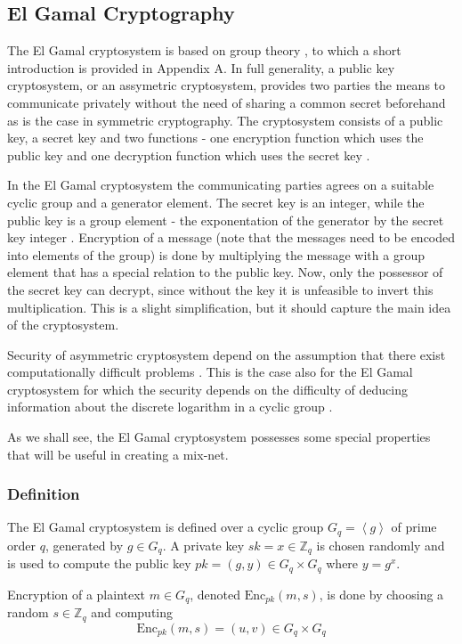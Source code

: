 \subsection{El Gamal Cryptography}

The El Gamal cryptosystem is based on group theory \cite[p.~297]{hac},
to which a short introduction is provided in Appendix A. In full
generality, a public key cryptosystem, or an assymetric cryptosystem,
provides two parties the means to communicate privately without the
need of sharing a common secret beforehand as is the case in symmetric
cryptography. The cryptosystem consists of a public key, a secret key
and two functions - one encryption function which uses the public key
and one decryption function which uses the secret key
\cite[p.~283]{hac}.

In the El Gamal cryptosystem the communicating parties agrees on a
suitable cyclic group and a generator element. The secret key is an
integer, while the public key is a group element - the exponentation
of the generator by the secret key integer
\cite[p.~297]{hac}. Encryption of a message (note that the messages
need to be encoded into elements of the group) is done by multiplying
the message with a group element that has a special relation to the
public key. Now, only the possessor of the secret key can decrypt,
since without the key it is unfeasible to invert this
multiplication. This is a slight simplification, but it should capture
the main idea of the cryptosystem.

Security of asymmetric cryptosystem depend on the assumption that
there exist computationally difficult problems
\cite[p.~306]{hac}. This is the case also for the El Gamal
cryptosystem for which the security depends on the difficulty of
deducing information about the discrete logarithm in a cyclic group
\cite[p.~294]{hac}.

As we shall see, the El Gamal cryptosystem possesses some special
properties that will be useful in creating a mix-net.

\subsubsection{Definition}
The El Gamal cryptosystem is defined over a cyclic group $G_q =
\left<g\right>$ of prime order $q$, generated by $g \in G_q$. A
private key $sk = x \in \mathbb{Z}_q$ is chosen randomly and is used
to compute the public key $pk = (g,y) \in G_q \times G_q$ where $y =
g^x$.

Encryption of a plaintext $m \in G_q$, denoted
$\mathrm{Enc}_{pk}(m,s)$, is done by choosing a random $s \in
\mathbb{Z}_q$ and computing
$$
\mathrm{Enc}_{pk}(m,s) = (u,v) \in G_q \times G_q
$$

